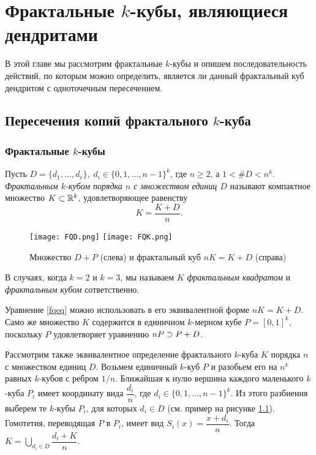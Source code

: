 \newpage
\chapter{Фрактальные $k$-кубы, являющиеся дендритами}

В этой главе мы рассмотрим фрактальные $k$-кубы и опишем последовательность действий, по которым можно определить, является ли данный фрактальный куб дендритом с одноточечным пересечением.


\section{Пересечения копий фрактального $k$-куба}


\subsection{Фрактальные $k$-кубы}

\begin{definition}
\label{dfn:FQ}
Пусть  $D=\{d_1,\ldots,d_r\},\; d_i\in\{0,1,\ldots,n-1\}^k$, где $n\ge 2$, а $1<\#D<n^k$.\\
{\em Фрактальным $k$-кубом порядка $n$ с множеством единиц $D$} называют компактное множество $K\subset\mathbb{R}^k$, удовлетворяющее равенству
\begin{equation}\label{fqeq}
K=\dfrac{K+D}{n}.
\end{equation}
\end{definition}

\begin{figure}[h!]
    \centering
    \qquad
    \texttt{[image: FQD.png]}
    \hfill
    \texttt{[image: FQK.png]}
    \qquad
    \caption{Множество $D+P$ (слева) и фрактальный куб $nK=K+D$ (справа)}
    \label{fig:FQ}
\end{figure}

В случаях, когда $k=2$ и $k=3$, мы называем $K$ \emph{фрактальным квадратом} и \emph{фрактальным кубом} сответственно.

Уравнение \eqref{fqeq} можно использовать в его эквивалентной форме $nK=K+D$.
Само же множество $K$ содержится в единичном $k$-мерном кубе $P=[0,1]^k$, поскольку $P$ удовлетворяет уравнению $nP\supset P+D$.

Рассмотрим также эквивалентное определение фрактального $k$-куба $K$ порядка $n$ с множеством единиц $D$.
Возьмем единичный $k$-куб $P$ и разобьем его на $n^k$ равных $k$-кубов с ребром $1/n$.
Ближайшая к нулю вершина каждого маленького $k$-куба $P_i$ имеет координату вида $\dfrac{d_i}{n}$, где $d_i\in\{0,1,\ldots,n-1\}^k$.
Из этого разбиения выберем те $k$-кубы $P_i$, для которых $d_i\in D$ (см. пример на рисунке \ref{fig:FQ}).
Гомотетия, переводящая $P$ в $P_i$, имеет вид $S_i(x)=\dfrac{x+d_i}{n}$.
Тогда $K=\bigcup\limits_{d_i\in D}\dfrac{d_i+K}{n}$.

